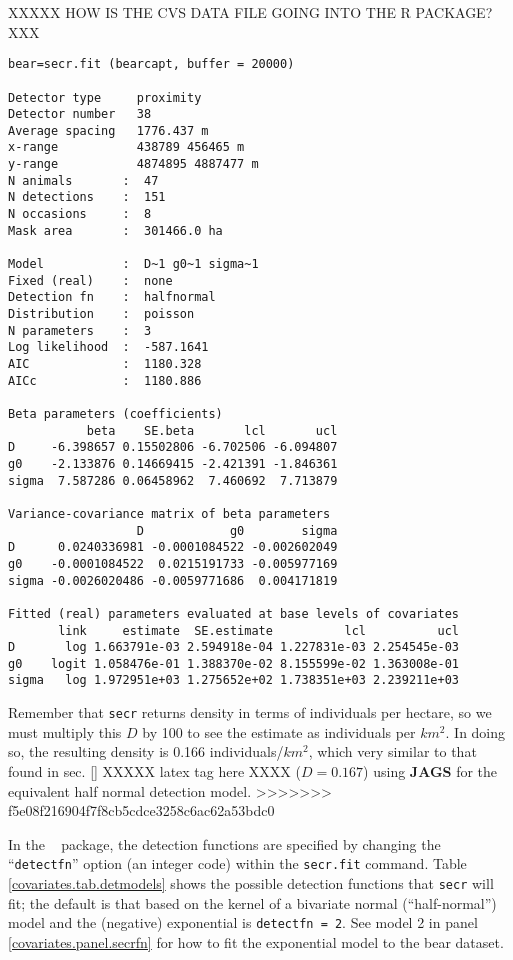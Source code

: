 XXXXX HOW IS THE CVS DATA FILE GOING INTO THE R PACKAGE? XXX
{\small
\begin{verbatim}
bear=secr.fit (bearcapt, buffer = 20000)

Detector type     proximity
Detector number   38
Average spacing   1776.437 m
x-range           438789 456465 m
y-range           4874895 4887477 m
N animals       :  47
N detections    :  151
N occasions     :  8
Mask area       :  301466.0 ha

Model           :  D~1 g0~1 sigma~1
Fixed (real)    :  none
Detection fn    :  halfnormal
Distribution    :  poisson
N parameters    :  3
Log likelihood  :  -587.1641
AIC             :  1180.328
AICc            :  1180.886

Beta parameters (coefficients)
           beta    SE.beta       lcl       ucl
D     -6.398657 0.15502806 -6.702506 -6.094807
g0    -2.133876 0.14669415 -2.421391 -1.846361
sigma  7.587286 0.06458962  7.460692  7.713879

Variance-covariance matrix of beta parameters
                  D            g0        sigma
D      0.0240336981 -0.0001084522 -0.002602049
g0    -0.0001084522  0.0215191733 -0.005977169
sigma -0.0026020486 -0.0059771686  0.004171819

Fitted (real) parameters evaluated at base levels of covariates
       link     estimate  SE.estimate          lcl          ucl
D       log 1.663791e-03 2.594918e-04 1.227831e-03 2.254545e-03
g0    logit 1.058476e-01 1.388370e-02 8.155599e-02 1.363008e-01
sigma   log 1.972951e+03 1.275652e+02 1.738351e+03 2.239211e+03
\end{verbatim}
}


Remember that \mbox{\tt secr} returns density in terms of
individuals per
hectare, so we must multiply this $D$ by 100 to see the estimate as
individuals per $km^2$.  In doing so, the resulting density is 0.166
individuals/$km^2$, which very similar to that found in sec. \ref{} XXXXX
latex tag here XXXX ($D = 0.167$)
using {\bf JAGS} for the equivalent half normal detection model. 
>>>>>>> f5e08f216904f7f8cb5cdce3258c6ac62a53bdc0

In the \secr~ package, the detection functions are specified
by changing the ``\mbox{\tt detectfn}'' option (an integer code)
within the \mbox{\tt secr.fit} command.  Table
\ref{covariates.tab.detmodels} shows the possible detection functions
that \mbox{\tt secr} will fit; the default is that based on the kernel
of a bivariate normal
(``half-normal'') model and the
(negative) exponential is \mbox{\tt detectfn = 2}.  See model 2 in 
panel \ref{covariates.panel.secrfn} for how to fit the exponential 
model to the bear dataset. 

